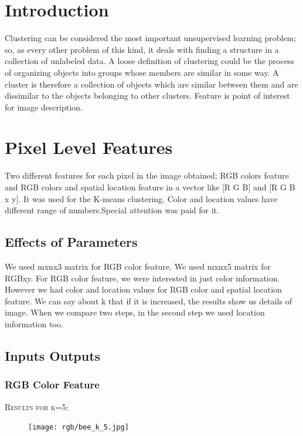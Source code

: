 \documentclass[12pt]{article}
\begin{document}

\tableofcontents
\pagebreak

\section*{Introduction}
Clustering can be considered the most important unsupervised learning problem; so, as every other problem of this kind, it deals with finding a structure in a collection of unlabeled data.
A loose definition of clustering could be the process of organizing objects into groups whose members are similar in some way.
A cluster is therefore a collection of objects which are similar between them and are dissimilar to the objects belonging to other clusters. Feature is point of interest for image description.


\section{Pixel Level Features}

Two different features for each pixel in the image obtained; RGB colors feature and RGB colors and spatial location feature in a vector like [R G B] and [R G B x y]. It was used for the K-means clustering. Color and location values have different range of numbers.Special attention was paid for it.
\subsection{Effects of Parameters}
We used  mxnx3 matrix for RGB color feature. We used mxnx5 matrix for RGBxy. For RGB color feature, we were interested in just color information. However we had color and location values for RGB color and spatial location feature. We can say about k that if it is increased, the results show us details of image. When we compare two steps, in the second step we used location information too. 

\subsection{Inputs Outputs}
\subsubsection{RGB Color Feature}
\begin{minipage}{\linewidth}
\centering
	\textsc{\large Results for k=5;}\\[0.1 cm]  
		\begin{figure} [H]
			\centering
			 \texttt{[image: rgb/bee\_k\_5.jpg]}
		\end{figure}	
\end{minipage}
\end{document}
